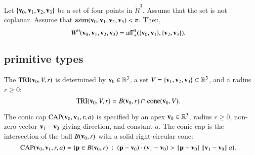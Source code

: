 \begin{lemma} Let $\{{\mathbf v}_0,{\mathbf v}_1,{\mathbf v}_2,{\mathbf v}_3\}$ be a set of four points
in $\ring{R}^3$.  Assume that the set is not coplanar.  Assume that
${\operatorname{azim}}({\mathbf v}_0,{\mathbf v}_1,{\mathbf v}_2,{\mathbf v}_3)<\pi$.  Then,
\begin{displaymath}W^0({\mathbf v}_0,{\mathbf v}_1,{\mathbf v}_2,{\mathbf v}_3) =
{\operatorname{aff}}^0_+(\{{\mathbf v}_0,{\mathbf v}_1\},\{{\mathbf v}_2,{\mathbf v}_3\}).\end{displaymath}
%
\end{lemma}


\subsection{primitive types}
%

\begin{definition}
 The 
${\operatorname{TRI}}({\mathbf v}_0,V,r)$ is determined by ${\mathbf v}_0\in\mathbb{R}^3$, a 
set $V=\{{\mathbf v}_1,{\mathbf v}_2,{\mathbf v}_3\}\subset\mathbb{R}^3$, and a radius $r\ge0$:
\begin{displaymath}
{\operatorname{TRI}}({\mathbf v}_0,V,r) = 
B({\mathbf v}_0,r)\cap {\operatorname{cone}}({\mathbf v}_0,V).
\end{displaymath}
%
%
%
\end{definition}



%


\begin{definition}
The conic cap ${\operatorname{CAP}}({\mathbf v}_0,{\mathbf v}_1,r,a)$ is specified by an apex
${\mathbf v}_0\in\mathbb{R}^3$,  radius $r\ge0$,  non-zero vector ${\mathbf v}_1-{\mathbf v}_0$ giving
direction, and constant $a$.  The conic cap is the intersection of
the ball $B({\mathbf v}_0,r)$ with a solid right-circular cone:
\begin{displaymath}
\op{CAP}(\v_0,\v_1,r,a)=\{\p \in B(\v_0,r) 
\mid (\p-\v_0)\cdot (\v_1-\v_0) > \norm{\p}{\v_0}\, \norm{\v_1}{\v_0}\, a\}.
\end{displaymath}
%
%
%
%
\end{definition}

